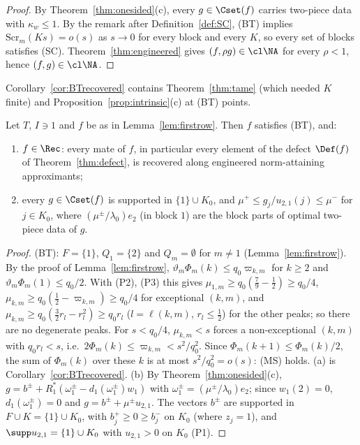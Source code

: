 \begin{proof}
By Theorem~\ref{thm:onesided}(c), every $g\in\Cset(f)$ carries two-piece
data with $\kappa_w\le1$.  By the remark after Definition~\ref{def:SC},
\textup{(BT)} implies $\mathrm{Scr}_m(Ks)=o(s)$ as $s\to0$ for every block
and every $K$, so every set of blocks satisfies \textup{(SC)}.
Theorem~\ref{thm:engineered} gives $(f,\rho g)\in\cl\NA$ for every
$\rho<1$, hence $(f,g)\in\cl\NA$.
\end{proof}

Corollary~\ref{cor:BTrecovered} contains Theorem~\ref{thm:tame}
(which needed $K$ finite) and Proposition~\ref{prop:intrinsic}(c) at
\textup{(BT)} points.

\begin{corollary}\label{cor:exampleRecovered}
Let $T$, $I\ni1$ and $f$ be as in Lemma~\ref{lem:firstrow}.  Then $f$
satisfies \textup{(BT)}, and:
\begin{enumerate}
\item[(a)] $f\in\Rec$: every mate of $f$, in particular every element of the
defect $\Def(f)$ of Theorem~\ref{thm:defect}, is recovered along engineered
norm-attaining approximants;
\item[(b)] every $g\in\Cset(f)$ is supported in $\{1\}\cup K_0$, and
$\mu^+\le g_j/u_{2,1}(j)\le\mu^-$ for $j\in K_0$, where
$(\mu^\pm/\lambda_0)e_2$ \textup{(}in block $1$\textup{)} are the block parts
of optimal two-piece data of $g$.
\end{enumerate}
\end{corollary}

\begin{proof}
\textup{(BT)}: $F=\{1\}$, $Q_1=\{2\}$ and $Q_m=\emptyset$ for $m\ne1$
(Lemma~\ref{lem:firstrow}).  By the proof of Lemma~\ref{lem:firstrow},
$\vartheta_m\Phi_m(k)\le q_0\varpi_{k,m}$ for $k\ge2$ and
$\vartheta_m\Phi_m(1)\le q_0/2$.  With (P2), (P3) this gives
$\mu_{1,m}\ge q_0(\frac79-\frac12)\ge q_0/4$, $\mu_{k,m}\ge q_0(\frac12-
\varpi_{k,m})\ge q_0/4$ for exceptional $(k,m)$, and $\mu_{k,m}\ge
q_0(\frac32r_l-r_l^2)\ge q_0r_l$ ($l=\ell(k,m)$, $r_l\le\frac12$) for the
other peaks; so there are no degenerate peaks.  For $s<q_0/4$,
$\mu_{k,m}<s$ forces a non-exceptional $(k,m)$ with $q_0r_l<s$, i.e.\
$2\Phi_m(k)\le\varpi_{k,m}<s^2/q_0^2$.  Since $\Phi_m(k+1)\le\Phi_m(k)/2$, the
sum of $\Phi_m(k)$ over these $k$ is at most $s^2/q_0^2=o(s)$: \textup{(MS)}
holds.  (a) is Corollary~\ref{cor:BTrecovered}.  (b) By
Theorem~\ref{thm:onesided}(c), $g=b^\pm+R_1^*(\omega^\pm_1-d_1(\omega^\pm_1)
w_1)$ with $\omega^\pm_1=(\mu^\pm/\lambda_0)e_2$; since $w_1(2)=0$,
$d_1(\omega^\pm_1)=0$ and $g=b^\pm+\mu^\pm u_{2,1}$.  The vectors $b^\pm$ are
supported in $F\cup K=\{1\}\cup K_0$, with $b^+_j\ge0\ge b^-_j$ on $K_0$
(where $z_j=1$), and $\supp u_{2,1}=\{1\}\cup K_0$ with $u_{2,1}>0$ on $K_0$
(P1).
\end{proof}

